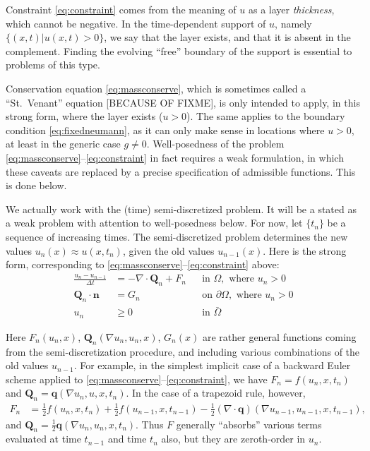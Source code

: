 \documentclass[final,leqno,onefignum,onetabnum]{siamltex1213bueler}
\newcommand\bn{\mathbf{n}}
\newcommand\bq{\mathbf{q}}
\newcommand\bQ{\mathbf{Q}}
\newcommand{\Div}{\nabla\cdot}
\renewcommand{\grad}{\nabla}
\begin{document}
Constraint \eqref{eq:constraint} comes from the meaning of $u$ as a layer \emph{thickness}, which cannot be negative.  In the time-dependent support of $u$, namely $\{(x,t) \big| u(x,t) > 0\}$, we say that the layer exists, and that it is absent in the complement.  Finding the evolving ``free'' boundary of the support is essential to problems of this type.

Conservation equation \eqref{eq:massconserve}, which is sometimes called a ``St.~Venant'' equation [BECAUSE OF FIXME], is only intended to apply, in this strong form, where the layer exists ($u>0$).  The same applies to the boundary condition \eqref{eq:fixedneumann}, as it can only make sense in locations where $u>0$, at least in the generic case $g\ne 0$.  Well-posedness of the problem \eqref{eq:massconserve}--\eqref{eq:constraint} in fact requires a weak formulation, in which these caveats are replaced by a precise specification of admissible functions.  This is done below.

We actually work with the (time) semi-discretized problem.  It will be a stated as a weak problem with attention to well-posedness below.  For now, let $\{t_n\}$ be a sequence of increasing times.  The semi-discretized problem determines the new values $u_n(x) \approx u(x,t_n)$, given the old values $u_{n-1}(x)$.  Here is the strong form, corresponding to \eqref{eq:massconserve}--\eqref{eq:constraint} above:
\begin{align}
\frac{u_n - u_{n-1}}{\Delta t} &= - \Div \bQ_n + F_n &&\text{in } \Omega, \text{ where } u_n > 0 \label{eq:semimassconserve} \\
\bQ_n \cdot \bn &= G_n &&\text{on } \partial\Omega, \text{ where } u_n > 0 \label{eq:semifixedneumann} \\
u_n &\ge 0 &&\text{in } \bar\Omega \label{eq:semiconstraint}
\end{align}

Here $F_n(u_n,x)$, $\bQ_n(\grad u_n,u_n,x)$, $G_n(x)$ are rather general functions coming from the semi-discretization procedure, and including various combinations of the old values $u_{n-1}$.  For example, in the simplest implicit case of a backward Euler scheme applied to \eqref{eq:massconserve}--\eqref{eq:constraint}, we have $F_n = f(u_n,x,t_n)$ and $\bQ_n = \bq(\grad u_n,u,x,t_n)$.  In the case of a trapezoid rule, however,
\begin{align*}
F_n &= \frac{1}{2} f(u_n,x,t_n) + \frac{1}{2} f(u_{n-1},x,t_{n-1}) - \frac{1}{2} \left(\Div \bq\right)(\grad u_{n-1},u_{n-1},x,t_{n-1}),
\end{align*}
and $\bQ_n = \frac{1}{2} \bq(\grad u_n,u_n,x,t_n)$.  Thus $F$ generally ``absorbs'' various terms evaluated at time $t_{n-1}$ and time $t_n$ also, but they are zeroth-order in $u_n$.
\end{document}
